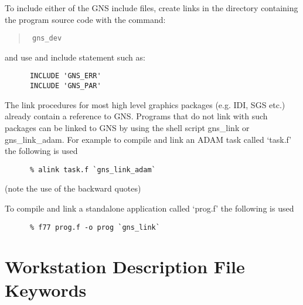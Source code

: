 To include either of the GNS include files, create links in the directory
containing the program source code with the command:
\begin{quote}{\tt
gns\_dev}
\end{quote}
and use and include statement such as:
\begin{verbatim}
      INCLUDE 'GNS_ERR'
      INCLUDE 'GNS_PAR'
\end{verbatim}

The link procedures for most high level graphics packages (e.g. IDI, SGS etc.)
already contain a reference to GNS. Programs that do not link with such
packages can be linked to GNS by using the shell script gns\_link
or gns\_link\_adam. For example to compile and link an ADAM task called
`task.f' the following is used
\begin{verbatim}
      % alink task.f `gns_link_adam`
\end{verbatim}
(note the use of the backward quotes)

To compile and link a standalone application called `prog.f' the following
is used
\begin{verbatim}
      % f77 prog.f -o prog `gns_link`
\end{verbatim}

\newpage\appendix
\section{Workstation Description File Keywords}\label{key}

